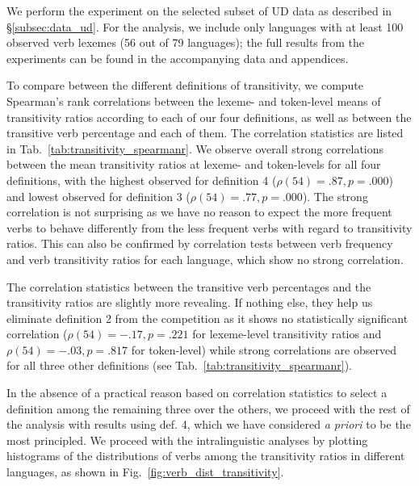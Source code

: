 We perform the experiment on the selected subset of UD data as described in §\ref{subsec:data_ud}. For the analysis, we include only languages with at least 100 observed verb lexemes (56 out of 79 languages); the full results from the experiments can be found in the accompanying data and appendices. 



To compare between the different definitions of transitivity, we compute Spearman's rank correlations between the lexeme- and token-level means of transitivity ratios according to each of our four definitions, as well as between the transitive verb percentage and each of them. The correlation statistics are listed in Tab.~\ref{tab:transitivity_spearmanr}. We observe overall strong correlations between the mean transitivity ratios at lexeme- and token-levels for all four definitions, with the highest observed for definition 4 ($\rho(54)=.87, p=.000$) and lowest observed for definition 3 ($\rho(54)=.77, p=.000$). The strong correlation is not surprising as we have no reason to expect the more frequent verbs to behave differently from the less frequent verbs with regard to transitivity ratios. This can also be confirmed by correlation tests between verb frequency and verb transitivity ratios for each language, which show no strong correlation.

The correlation statistics between the transitive verb percentages and the transitivity ratios are slightly more revealing. If nothing else, they help us eliminate definition 2 from the competition as it shows no statistically significant correlation ($\rho(54)=-.17, p=.221$ for lexeme-level transitivity ratios and $\rho(54)=-.03, p=.817$ for token-level) while strong correlations are observed for all three other definitions (see Tab.~\ref{tab:transitivity_spearmanr}).

In the absence of a practical reason based on correlation statistics to select a definition among the remaining three over the others, we proceed with the rest of the analysis with results using def. 4, which we have considered \textit{a priori} to be the most principled. We proceed with the intralinguistic analyses by plotting histograms of the distributions of verbs among the transitivity ratios in different languages, as shown in Fig.~\ref{fig:verb_dist_transitivity}.

